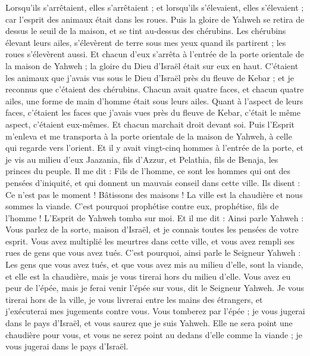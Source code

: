 \begin{multicols}{2}
Lorsqu'ils s'arrêtaient, elles s'arrêtaient ; et lorsqu'ils s'élevaient, elles s'élevaient ; car l'esprit des animaux était dans les roues.
Puis la gloire de Yahweh se retira de dessus le seuil de la maison, et se tint au-dessus des chérubins.
Les chérubins élevant leurs ailes, s'élevèrent de terre sous mes yeux quand ils partirent ; les roues s'élevèrent aussi. Et chacun d'eux s'arrêta à l'entrée de la porte orientale de la maison de Yahweh ; la gloire du Dieu d'Israël était sur eux en haut.
C’étaient les animaux que j'avais vus sous le Dieu d'Israël près du fleuve de Kebar ; et je reconnus que c'étaient des chérubins.
Chacun avait quatre faces, et chacun quatre ailes, une forme de main d'homme était sous leurs ailes.
Quant à l’aspect de leurs faces, c'étaient les faces que j'avais vues près du fleuve de Kebar, c’était le même aspect, c’étaient eux-mêmes. Et chacun marchait droit devant soi.
\VerseOne{}Puis l'Esprit m'enleva et me transporta à la porte orientale de la maison de Yahweh, à celle qui regarde vers l'orient. Et il y avait vingt-cinq hommes à l'entrée de la porte, et je vis au milieu d'eux Jaazania, fils d’Azzur, et Pelathia, fils de Benaja, les princes du peuple.
Il me dit : Fils de l’homme, ce sont les hommes qui ont des pensées d'iniquité, et qui donnent un mauvais conseil dans cette ville.
Ils disent : Ce n'est pas le moment ! Bâtissons des maisons ! La ville est la chaudière et nous sommes la viande.
C'est pourquoi prophétise contre eux, prophétise, fils de l’homme !
L'Esprit de Yahweh tomba sur moi. Et il me dit : Ainsi parle Yahweh : Vous parlez de la sorte, maison d'Israël, et je connais toutes les pensées de votre esprit.
Vous avez multiplié les meurtres dans cette ville, et vous avez rempli ses rues de gens que vous avez tués.
C'est pourquoi, ainsi parle le Seigneur Yahweh : Les gens que vous avez tués, et que vous avez mis au milieu d'elle, sont la viande, et elle est la chaudière, mais je vous tirerai hors du milieu d'elle.
Vous avez eu peur de l'épée, mais je ferai venir l'épée sur vous, dit le Seigneur Yahweh.
Je vous tirerai hors de la ville, je vous livrerai entre les mains des étrangers, et j'exécuterai mes jugements contre vous.
Vous tomberez par l'épée ; je vous jugerai dans le pays d'Israël, et vous saurez que je suis Yahweh.
Elle ne sera point une chaudière pour vous, et vous ne serez point au dedans d'elle comme la viande ; je vous jugerai dans le pays d'Israël.

\end{multicols}
